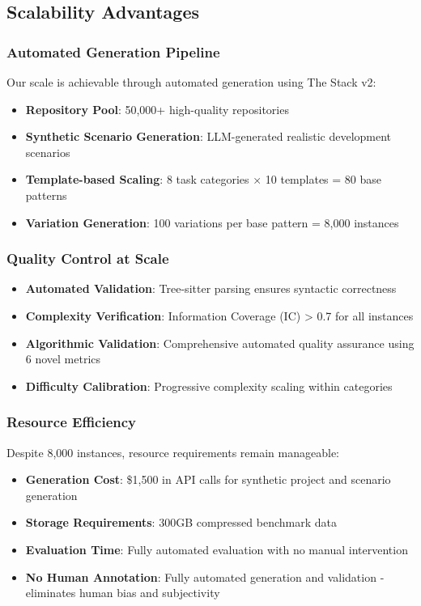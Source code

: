 \documentclass{article}
\begin{document}
\subsection{Scalability Advantages}

\subsubsection{Automated Generation Pipeline}
Our scale is achievable through automated generation using The Stack v2:
\begin{itemize}
    \item \textbf{Repository Pool}: 50,000+ high-quality repositories
    \item \textbf{Synthetic Scenario Generation}: LLM-generated realistic development scenarios
    \item \textbf{Template-based Scaling}: 8 task categories × 10 templates = 80 base patterns
    \item \textbf{Variation Generation}: 100 variations per base pattern = 8,000 instances
\end{itemize}

\subsubsection{Quality Control at Scale}
\begin{itemize}
    \item \textbf{Automated Validation}: Tree-sitter parsing ensures syntactic correctness
    \item \textbf{Complexity Verification}: Information Coverage (IC) > 0.7 for all instances
    \item \textbf{Algorithmic Validation}: Comprehensive automated quality assurance using 6 novel metrics
    \item \textbf{Difficulty Calibration}: Progressive complexity scaling within categories
\end{itemize}

\subsubsection{Resource Efficiency}
Despite 8,000 instances, resource requirements remain manageable:
\begin{itemize}
    \item \textbf{Generation Cost}: \$1,500 in API calls for synthetic project and scenario generation
    \item \textbf{Storage Requirements}: 300GB compressed benchmark data
    \item \textbf{Evaluation Time}: Fully automated evaluation with no manual intervention
    \item \textbf{No Human Annotation}: Fully automated generation and validation - eliminates human bias and subjectivity
\end{itemize}
\end{document}
